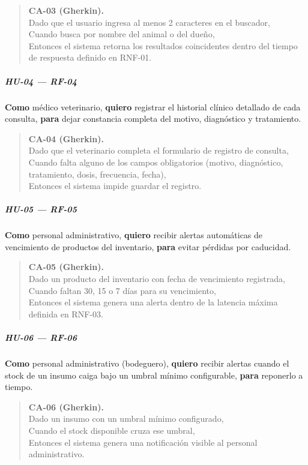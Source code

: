 \documentclass[
]{article}
\begin{document}
\begin{quote}
\textbf{CA-03 (Gherkin).} \\
Dado que el usuario ingresa al menos 2 caracteres en el buscador, \\
Cuando busca por nombre del animal o del dueño, \\
Entonces el sistema retorna los resultados coincidentes dentro del tiempo de respuesta definido en RNF-01.
\end{quote}

\subparagraph{HU-04 --- RF-04}
\textbf{Como} médico veterinario,
\textbf{quiero} registrar el historial clínico detallado de cada consulta,
\textbf{para} dejar constancia completa del motivo, diagnóstico y tratamiento.

\begin{quote}
\textbf{CA-04 (Gherkin).} \\
Dado que el veterinario completa el formulario de registro de consulta, \\
Cuando falta alguno de los campos obligatorios (motivo, diagnóstico, tratamiento, dosis, frecuencia, fecha), \\
Entonces el sistema impide guardar el registro.
\end{quote}

\subparagraph{HU-05 --- RF-05}
\textbf{Como} personal administrativo,
\textbf{quiero} recibir alertas automáticas de vencimiento de productos del inventario,
\textbf{para} evitar pérdidas por caducidad.

\begin{quote}
\textbf{CA-05 (Gherkin).} \\
Dado un producto del inventario con fecha de vencimiento registrada, \\
Cuando faltan 30, 15 o 7 días para su vencimiento, \\
Entonces el sistema genera una alerta dentro de la latencia máxima definida en RNF-03.
\end{quote}

\subparagraph{HU-06 --- RF-06}
\textbf{Como} personal administrativo (bodeguero),
\textbf{quiero} recibir alertas cuando el stock de un insumo caiga bajo un umbral mínimo configurable,
\textbf{para} reponerlo a tiempo.

\begin{quote}
\textbf{CA-06 (Gherkin).} \\
Dado un insumo con un umbral mínimo configurado, \\
Cuando el stock disponible cruza ese umbral, \\
Entonces el sistema genera una notificación visible al personal administrativo.
\end{quote}
\end{document}
